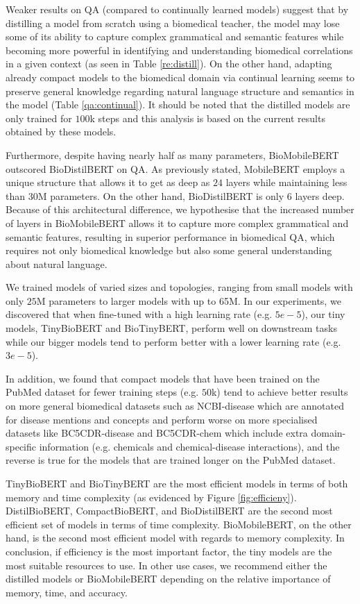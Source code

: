 \documentclass{article}
\begin{document}
Weaker results on QA (compared to continually learned models) suggest that by distilling a model from scratch using a biomedical teacher, the model may lose some of its ability to capture complex grammatical and semantic features while becoming more powerful in identifying and understanding biomedical correlations in a given context (as seen in Table \ref{re:distill}). On the other hand, adapting already compact models to the biomedical domain via continual learning seems to preserve general knowledge regarding natural language structure and semantics in the model (Table \ref{qa:continual}). It should be noted that the distilled models are only trained for $100$k steps and this analysis is based on the current results obtained by these models.

Furthermore, despite having nearly half as many parameters, BioMobileBERT outscored BioDistilBERT on QA. As previously stated, MobileBERT employs a unique structure that allows it to get as deep as $24$ layers while maintaining less than $30$M parameters. On the other hand, BioDistilBERT is only $6$ layers deep. Because of this architectural difference, we hypothesise that the increased number of layers in BioMobileBERT allows it to capture more complex grammatical and semantic features, resulting in superior performance in biomedical QA, which requires not only biomedical knowledge but also some general understanding about natural language. 

We trained models of varied sizes and topologies, ranging from small models with only $25$M parameters to larger models with up to 65M. In our experiments, we discovered that when fine-tuned with a high learning rate (e.g. $5e-5$), our tiny models, TinyBioBERT and BioTinyBERT, perform well on downstream tasks while our bigger models tend to perform better with a lower learning rate (e.g. $3e-5$).

In addition, we found that compact models that have been trained on the PubMed dataset for fewer training steps (e.g. $50$k) tend to achieve better results on more general biomedical datasets such as NCBI-disease which are annotated for disease mentions and concepts and perform worse on more specialised datasets like BC5CDR-disease and BC5CDR-chem which include extra domain-specific information (e.g. chemicals and chemical-disease interactions), and the reverse is true for the models that are trained longer on the PubMed dataset.

TinyBioBERT and BioTinyBERT are the most efficient models in terms of both memory and time complexity (as evidenced by Figure \ref{fig:efficieny}). DistilBioBERT, CompactBioBERT, and BioDistilBERT are the second most efficient set of models in terms of time complexity. BioMobileBERT, on the other hand, is the second most efficient model with regards to memory complexity. In conclusion, if efficiency is the most important factor, the tiny models are the most suitable resources to use. In other use cases, we recommend either the distilled models or BioMobileBERT depending on the relative importance of memory, time, and accuracy.
\end{document}
